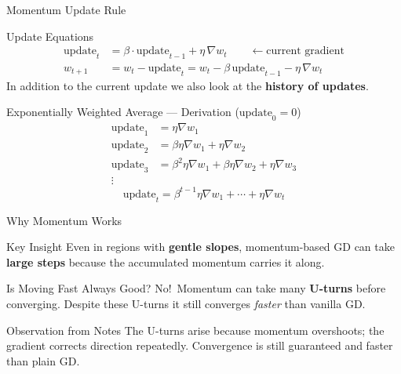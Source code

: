 \documentclass{beamer}
\begin{document}
\begin{frame}[shrink=10]{Momentum Update Rule}
  \begin{block}{Update Equations}
    \begin{align*}
      \text{update}_t &= \beta\cdot\text{update}_{t-1}
                        + \eta\,\nabla w_t
                        \qquad\leftarrow\text{current gradient}\\[4pt]
      w_{t+1}        &= w_t - \text{update}_t
                       = w_t - \beta\,\text{update}_{t-1}
                         - \eta\,\nabla w_t
    \end{align*}
    In addition to the current update we also look at the
    \textbf{history of updates}.
  \end{block}

  \medskip

  \begin{exampleblock}{Exponentially Weighted Average --- Derivation ($\text{update}_0=0$)}
    \begin{align*}
      \text{update}_1 &= \eta\nabla w_1\\
      \text{update}_2 &= \beta\eta\nabla w_1 + \eta\nabla w_2\\
      \text{update}_3 &= \beta^2\eta\nabla w_1
                         + \beta\eta\nabla w_2 + \eta\nabla w_3\\
      \vdots\;&
    \end{align*}
    \[
      \boxed{\text{update}_t
        = \beta^{t-1}\eta\nabla w_1 + \cdots + \eta\nabla w_t}
    \]
  \end{exampleblock}
\end{frame}

\begin{frame}[shrink=10]{Why Momentum Works}
  \begin{block}{Key Insight}
    Even in regions with \textbf{gentle slopes}, momentum-based GD can
    take \textbf{large steps} because the accumulated momentum carries
    it along.
  \end{block}

  \bigskip

  \begin{alertblock}{Is Moving Fast Always Good?}
    No!\ Momentum can take many \textbf{U-turns} before converging.
    Despite these U-turns it still converges \emph{faster} than vanilla GD.
  \end{alertblock}

  \bigskip

  \begin{exampleblock}{Observation from Notes}
    The U-turns arise because momentum overshoots; the gradient
    corrects direction repeatedly.
    Convergence is still guaranteed and faster than plain GD.
  \end{exampleblock}
\end{frame}
\end{document}
